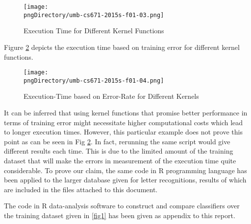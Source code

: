 \begin{figure}\centering
\texttt{[image: \\pngDirectory/umb-cs671-2015s-f01-03.png]}
\caption{Execution Time for Different Kernel Functions}\label{fig3}
\end{figure}

Figure \ref{fig4} depicts the execution time based on training error for different kernel functions.

\begin{figure}\centering
\texttt{[image: \\pngDirectory/umb-cs671-2015s-f01-04.png]}
\caption{Execution-Time based on Error-Rate for Different Kernels}\label{fig4}
\end{figure}

It can be inferred that using kernel functions that promise better performance in terms of training error might necessitate higher computational costs which lead to longer execution times.
However, this particular example does not prove this point as can be seen in Fig \ref{fig4}.
In fact, rerunning the same script would give different results each time.
This is due to the limited amount of the training dataset that will make the errors in measurement of the execution time quite considerable.
To prove our claim, the same code in R programming language has been applied to the larger database given for letter recognitions, results of which are included in the files attached to this document.

The code in R data-analysis software to construct and compare classifiers over the training dataset given in \ref{fig1} has been given as appendix to this report.
